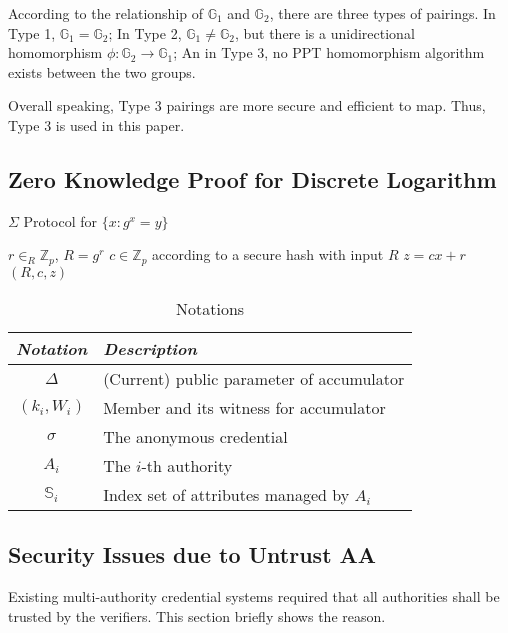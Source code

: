 \documentclass[journal]{IEEEtran}
\begin{document}
According to the relationship of $\mathbb{G}_1$ and $\mathbb{G}_2$, there are three types of pairings. 
In Type 1, $\mathbb{G}_1 = \mathbb{G}_2$; In Type 2, $\mathbb{G}_1 \neq \mathbb{G}_2$, but there is a unidirectional homomorphism $\phi:\mathbb{G}_2 \rightarrow \mathbb{G}_1$; An in Type 3, no PPT homomorphism algorithm exists between the two groups.

Overall speaking, Type 3 pairings are more secure and efficient to map. Thus, Type 3 is used in this paper.

\subsection{Zero Knowledge Proof for Discrete Logarithm}

\begin{algorithm}[h]
	\caption{$\Sigma$ Protocol for $\{x: g^x = y\}$}\label{alg:dlproof}
	\begin{algorithmic}[1]
		\STATE $r\in_R\mathbb{Z}_p$, $R = g^r$ 
		\STATE $c\in \mathbb{Z}_p $ according to a secure hash with input $R$
		\STATE $z = cx + r$
		\RETURN $(R, c, z)$
	\end{algorithmic}
\end{algorithm}

	\begin{table}[h]
		\caption{Notations}
		\label{table:notate}
		\centering
		\begin{tabular}{c|l}
			\hline
			\emph{Notation} & \emph{Description}\\
			\hline
			$\Delta$ & (Current) public parameter of accumulator\\
			$(k_i, W_i)$ & Member and its witness for accumulator\\
			$\sigma$ & The anonymous credential\\
			$A_i$ & The $i$-th authority\\
			$\mathbb{S}_i$ & Index set of attributes managed by $A_i$\\
		\end{tabular}
	\end{table}
\subsection{Security Issues due to Untrust AA}
Existing multi-authority credential systems required that all authorities shall be trusted by the verifiers. This section briefly shows the reason.
\end{document}
